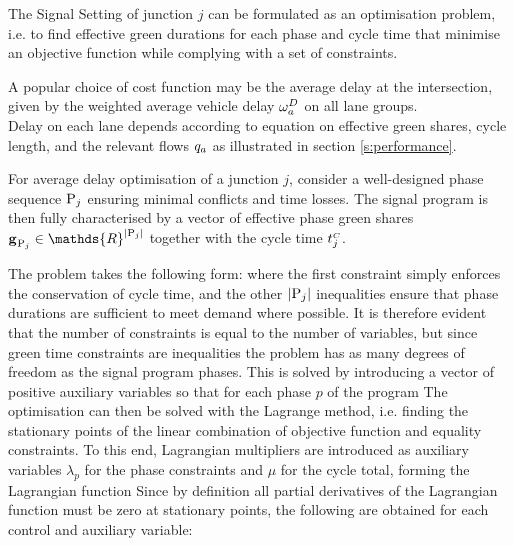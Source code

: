 The Signal Setting of junction $j$ can be formulated as an optimisation problem, i.e. to find
effective green durations for each phase and cycle time that minimise an objective function while complying with a set of constraints.

A popular choice of cost function may be the average delay at the intersection, given by the weighted average vehicle delay $\omega_{a}^{D}$ on all lane groups.\\Delay on each lane depends according to equation  on effective green shares, cycle length, and the relevant flows $q_a$ as illustrated in section \ref{s:performance}.

For average delay optimisation of a junction $j$, consider a well-designed phase sequence $\mathrm{P}_j$ ensuring minimal conflicts and time losses. The signal program is then fully characterised by a vector of effective phase green shares $\grenvec \in \mathds{R}^{|\phaset_j|}$ together with the cycle time $t_{j}^{\scriptscriptstyle{C}}$.

The problem takes the following form:
where the first constraint simply enforces the conservation of cycle time, and the other $|\mathrm{P}_j|$ inequalities ensure that phase durations are sufficient to meet demand where possible.
It is therefore evident that the number of constraints is equal to the number of variables, but since green time constraints are inequalities the problem has as many degrees of freedom as the signal program phases. This is solved by introducing a vector of positive auxiliary variables so that for each phase $p$ of the program
The optimisation can then be solved with the Lagrange method, i.e. finding the stationary points of the linear combination of objective function and equality constraints. To this end, Lagrangian multipliers are introduced as auxiliary variables $\lambda_p$ for the phase constraints and $\mu$ for the cycle total, forming the Lagrangian function
Since by definition all partial derivatives of the Lagrangian function must be zero at stationary points, the following are obtained for each control and auxiliary variable:
\newcommand{\dld}[1]{\frac{\partial \mathscr{L}}{\partial #1}}

